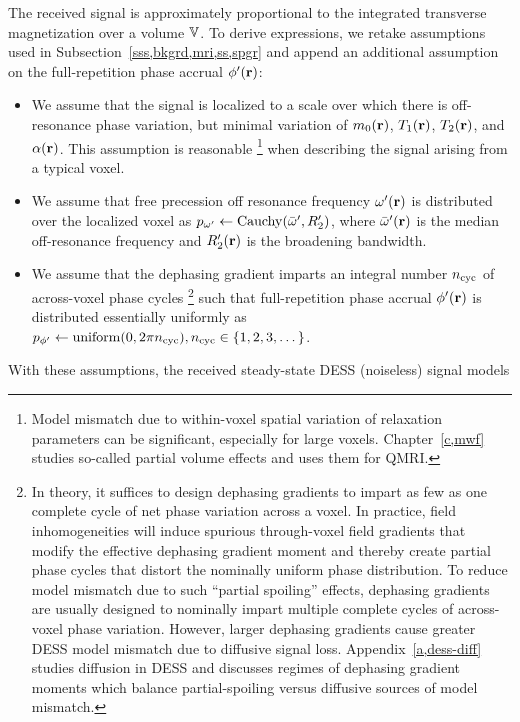 The received signal is approximately proportional
to the integrated transverse magnetization 
over a volume $\mathbb{V}$.
To derive expressions,
we retake assumptions used
in Subsection~\ref{sss,bkgrd,mri,ss,spgr}
and append an additional assumption
on the full-repetition phase accrual $\php\pr$:
\begin{itemize}
	\item We assume that
		the signal is localized
		to a scale over which
		there is off-resonance phase variation,
		but minimal variation
		of $\mzero\pr$, $\To\pr$, $\Tt\pr$, and $\flip\pr$.
		This assumption is reasonable
		\footnote{Model mismatch due
			to within-voxel spatial variation 
			of relaxation parameters
			can be significant,
			especially for large voxels.
			Chapter~\ref{c,mwf} studies 
			so-called partial volume effects
			and uses them for QMRI.
		} 
		when describing the signal 
		arising from a typical voxel.
	\item We assume that
		free precession off resonance frequency $\omp\pr$
		is distributed over the localized voxel
		as $\dist{\omp} \gets \operatorname{Cauchy}\paren{\ompmed,\Rtp}$,
		where $\ompmed\pr$ is the median off-resonance frequency
		and $\Rtp\pr$ is the broadening bandwidth.
	\item We assume that 
		the dephasing gradient imparts 
		an integral number $n_\mathrm{cyc}$ of across-voxel phase cycles
		\footnote{In theory,
			it suffices to design dephasing gradients
			to impart as few as one complete cycle
			of net phase variation across a voxel.
			In practice,
			field inhomogeneities will induce
			spurious through-voxel field gradients 
			that modify the effective dephasing gradient moment
			and thereby create partial phase cycles
			that distort the nominally uniform phase distribution.
			To reduce model mismatch 
			due to such ``partial spoiling'' effects,
			dephasing gradients are usually designed
			to nominally impart multiple complete cycles
			of across-voxel phase variation.
			However, 
			larger dephasing gradients
			cause greater DESS model mismatch
			due to diffusive signal loss.
			Appendix~\ref{a,dess-diff} 
			studies diffusion in DESS
			and discusses regimes of dephasing gradient moments
			which balance partial-spoiling versus diffusive
			sources of model mismatch.
		}
		such that full-repetition phase accrual $\php\pr$ 
		is distributed essentially uniformly
		as $\dist{\php} \gets \operatorname{uniform}\paren{0,2\pi\cyc},
		\cyc\in\set{1,2,3,\dots}$.  
\end{itemize}
With these assumptions, 
the received steady-state DESS (noiseless) signal models
